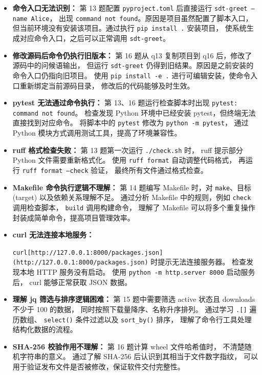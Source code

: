 \documentclass[UTF8,a4paper,11pt]{ctexart}
\begin{document}
\begin {itemize}[leftmargin=2em]
\item \textbf {命令入口无法识别：}
第 13 题配置 \texttt {pyproject.toml} 后直接运行 \texttt {sdt-greet --name Alice}，
出现 \texttt {command not found}。原因是项目虽然配置了脚本入口，
但当前环境没有安装该项目。通过执行 \texttt {pip install .} 安装项目，
使系统生成对应命令入口，之后可以正常调用 \texttt {sdt-greet}。
\item \textbf {修改源码后命令仍执行旧版本：}
第 16 题从 q13 复制项目到 q16 后，修改了源码中的问候语输出，
但运行 \texttt {sdt-greet} 仍得到旧结果。原因是之前安装的命令入口仍指向旧项目。
使用 \texttt {pip install -e .} 进行可编辑安装，使命令入口重新绑定当前源码目录，
修改后的代码能够及时生效。
\item \textbf {pytest 无法通过命令执行：}
第 13、16 题运行检查脚本时出现 \texttt {pytest: command not found}。
检查发现 Python 环境中已经安装 pytest，但终端无法直接找到对应命令。
将脚本中的 \texttt {pytest} 修改为 \texttt {python -m pytest}，
通过 Python 模块方式调用测试工具，提高了环境兼容性。
\item \textbf {ruff 格式检查失败：}
第 13 题第一次运行 \texttt {./check.sh} 时，
ruff 提示部分 Python 文件需要重新格式化。
使用 \texttt {ruff format} 自动调整代码格式，
再运行 \texttt {ruff format --check} 验证，
最终所有文件通过格式检查。
\item \textbf {Makefile 命令执行逻辑不理解：}
第 14 题编写 Makefile 时，对 \texttt {make}、目标 (target) 以及依赖关系理解不足。
通过分析 Makefile 中的规则，例如 \texttt {check} 调用检查脚本，
\texttt {build} 调用构建命令，
理解了 Makefile 可以将多个重复操作封装成简单命令，提高项目管理效率。
\item \textbf {curl 无法连接本地服务：}

\texttt {curl[http://127.0.0.1:8000/packages.json](http://127.0.0.1:8000/packages.json)}
时提示无法连接服务器。
检查发现本地 HTTP 服务没有启动。
使用 \texttt {python -m http.server 8000} 启动服务后，
curl 能够正常获取 JSON 数据。
\item \textbf{理解 jq 筛选与排序逻辑困难：}
第 15 题中需要筛选 active 状态且 downloads 不少于 100 的数据，
同时按照下载量降序、名称升序排列。
通过学习 \texttt{.[]} 遍历数组、
\texttt{select()} 条件过滤以及 \texttt{sort\_by()} 排序，
理解了命令行工具处理结构化数据的流程。
\item \textbf{SHA-256 校验作用不理解：}
第 16 题计算 wheel 文件哈希值时，
不清楚随机字符串的意义。
通过了解 SHA-256 后认识到其相当于文件数字指纹，
可以用于验证发布文件是否被修改，保证软件交付完整性。
\end{itemize}
\end{document}

